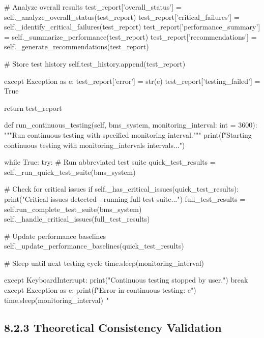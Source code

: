             \# Analyze overall results
            test_report['overall_status'] = self._analyze_overall_status(test_report)
            test_report['critical_failures'] = self._identify_critical_failures(test_report)
            test_report['performance_summary'] = self._summarize_performance(test_report)
            test_report['recommendations'] = self._generate_recommendations(test_report)
            
            \# Store test history
            self.test_history.append(test_report)
            
        except Exception as e:
            test_report['error'] = str(e)
            test_report['testing_failed'] = True
            
        return test_report
        
    def run_continuous_testing(self, bms_system, monitoring_interval: int = 3600):
        """Run continuous testing with specified monitoring interval."""
        print(f"Starting continuous testing with {monitoring_interval}s intervals...")
        
        while True:
            try:
                \# Run abbreviated test suite
                quick_test_results = self._run_quick_test_suite(bms_system)
                
                \# Check for critical issues
                if self._has_critical_issues(quick_test_results):
                    print("Critical issues detected - running full test suite...")
                    full_test_results = self.run_complete_test_suite(bms_system)
                    self._handle_critical_issues(full_test_results)
                
                \# Update performance baselines
                self._update_performance_baselines(quick_test_results)
                
                \# Sleep until next testing cycle
                time.sleep(monitoring_interval)
                
            except KeyboardInterrupt:
                print("Continuous testing stopped by user.")
                break
            except Exception as e:
                print(f"Error in continuous testing: {e}")
                time.sleep(monitoring_interval)
\texttt{`}

\subsection{8.2.3 Theoretical Consistency Validation}

